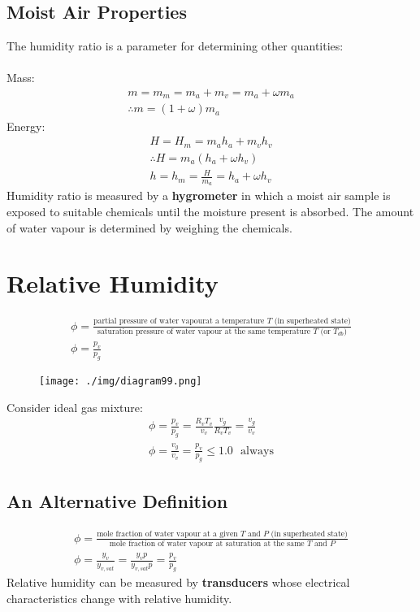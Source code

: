\subsection{Moist Air Properties}
The humidity ratio is a parameter for determining other quantities: \\\\
Mass:
\begin{gather}
  m = m_m = m_a + m_v = m_a + \omega m_a \\[5pt]
  \therefore m = (1+\omega)m_a
\end{gather}
Energy:
\begin{gather}
  H = H_m = m_ah_a + m_vh_v \\[5pt]
  \therefore H = m_a(h_a + \omega h_v) \\[5pt]
  h = h_m = \frac{H}{m_a} = h_a + \omega h_v
\end{gather}
Humidity ratio is measured by a \textbf{hygrometer} in which a moist air sample is exposed to suitable chemicals until the moisture present is absorbed. The amount of water vapour is determined by weighing the chemicals.
\section{Relative Humidity}
\begin{gather}
  \phi = \frac{\text{partial pressure of water vapourat a temperature $T$ (in superheated state)}}{\text{saturation pressure of water vapour at the same temperature $T$ (or $T_{db}$)}} \\[5pt]
  \phi = \frac{p_v}{p_g}
\end{gather}
\begin{figure}[H]
  \centering
  \texttt{[image: ./img/diagram99.png]}
  \caption{}
\end{figure}
Consider ideal gas mixture:
\begin{gather}
  \phi = \frac{p_v}{p_g} = \frac{R_v T_v}{v_v}\frac{v_g}{R_v T_v} = \frac{v_g}{v_v} \\[5pt]
  \phi = \frac{v_g}{v_v} = \frac{p_v}{p_g} \leq 1.0 \ \ \ \text{always}
\end{gather}
\subsection{An Alternative Definition}
\begin{gather}
  \phi = \frac{\text{mole fraction of water vapour at a given $T$ and $P$ (in superheated state)}}{\text{mole fraction of water vapour at saturation at the same $T$ and $P$}} \\[5pt]
  \phi = \frac{y_v}{y_{v,sat}} = \frac{y_vp}{y_{v,sat}p} = \frac{p_v}{p_g}
\end{gather}
Relative humidity can be measured by \textbf{transducers} whose electrical characteristics change with relative humidity.
